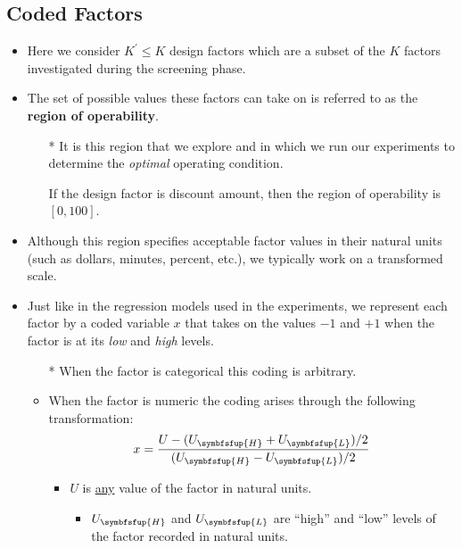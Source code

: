 \subsection*{Coded Factors}
\begin{itemize}
    \item Here we consider $ K^\prime\le K $ design factors which are a subset of the $K$ factors investigated during the
          screening phase.
    \item The set of possible values these factors can take on is referred to as the \textbf{region of operability}.
          \begin{itemize}
              \item[*] It is this region that we explore and in which we run our experiments to determine the \emph{optimal}
                  operating condition.
                  \begin{Example}{}{}
                      If the design factor is discount amount, then the region of operability is $ [0,100] $.
                  \end{Example}
          \end{itemize}
    \item Although this region specifies acceptable factor values in their natural units (such as dollars, minutes,
          percent, etc.), we typically work on a transformed scale.
    \item Just like in the regression models used in the experiments, we represent each factor by a coded variable
          $x$ that takes on the values $-1$ and $+1$ when the factor is at its \emph{low} and \emph{high} levels.
          \begin{itemize}
              \item[*] When the factor is categorical this coding is arbitrary.
              \item When the factor is numeric the coding arises through the following transformation:
                    \[ x=\frac{U-(U_{\symbfsfup{H}}+U_{\symbfsfup{L}})/2}{(U_{\symbfsfup{H}}-U_{\symbfsfup{L}})/2}  \]
                    \begin{itemize}
                        \item $ U $ is \underline{any} value of the factor in natural units.
                              \begin{itemize}
                                  \item $ U_{\symbfsfup{H}} $ and $ U_{\symbfsfup{L}} $ are ``high'' and ``low'' levels of the factor recorded in natural units.

\end{itemize}
\end{itemize}
\end{itemize}
\end{itemize}
